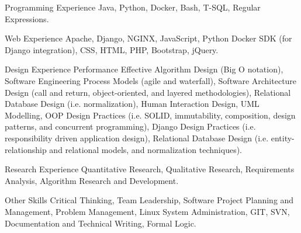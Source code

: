 

\begin{cvskills}

  \cvskill
    {Programming Experience} %
    {Java, Python, Docker, Bash, T-SQL, Regular Expressions.} %

  \cvskill
    {Web Experience} %
    {Apache, Django, NGINX, JavaScript, Python Docker SDK (for Django integration), CSS, HTML, PHP, Bootstrap, jQuery.} %

  \cvskill
    {Design Experience} %
    {Performance Effective Algorithm Design (Big O notation), Software Engineering Process Models (agile and waterfall), Software Architecture Design (call and return, object-oriented, and layered methodologies), Relational Database Design (i.e. normalization), Human Interaction Design, UML Modelling, OOP Design Practices (i.e. SOLID, immutability, composition, design patterns, and concurrent programming), Django Design Practices (i.e. responsibility driven application design), Relational Database Design (i.e. entity-relationship and relational models, and normalization techniques).} %

  \cvskill
    {Research Experience} %
    {Quantitative Research, Qualitative Research, Requirements Analysis, Algorithm Research and Development.} %

  \cvskill
    {Other Skills} %
    {Critical Thinking, Team Leadership, Software Project Planning and Management, Problem Management, Linux System Administration, GIT, SVN, Documentation and Technical Writing, Formal Logic.} %

\end{cvskills}
